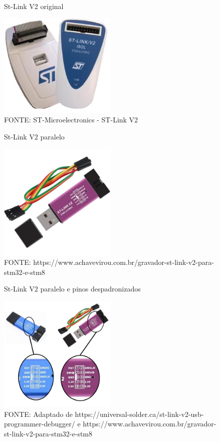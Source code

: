 \begin{figure}[ht]
	\centering
	\caption{St-Link V2 original}
	\includegraphics[width=0.5\textwidth]{figures/stlinkv2_original}
	\caption*{FONTE: ST-Microelectronics - ST-Link V2 \cite{st_link_v2}}
    \label{stlinkv2_original}
\end{figure}


\begin{figure}[ht]
	\centering
	\caption{St-Link V2 paralelo}
	\includegraphics[width=0.5\textwidth]{figures/stlinkv2_cheap}
	\caption*{FONTE: https://www.achavevirou.com.br/gravador-st-link-v2-para-stm32-e-stm8}
    \label{stlinkv2_cheap}
\end{figure}


\begin{figure}[ht]
	\centering
	\caption{St-Link V2 paralelo e pinos despadronizados}
	\includegraphics[width=0.5\textwidth]{figures/stlinkv2_cheap_pin_diff}
	\caption*{
		FONTE: Adaptado de https://universal-solder.ca/st-link-v2-usb-programmer-debugger/
		e https://www.achavevirou.com.br/gravador-st-link-v2-para-stm32-e-stm8
	}
    \label{stlinkv2_cheap_pin_diff}
\end{figure}

